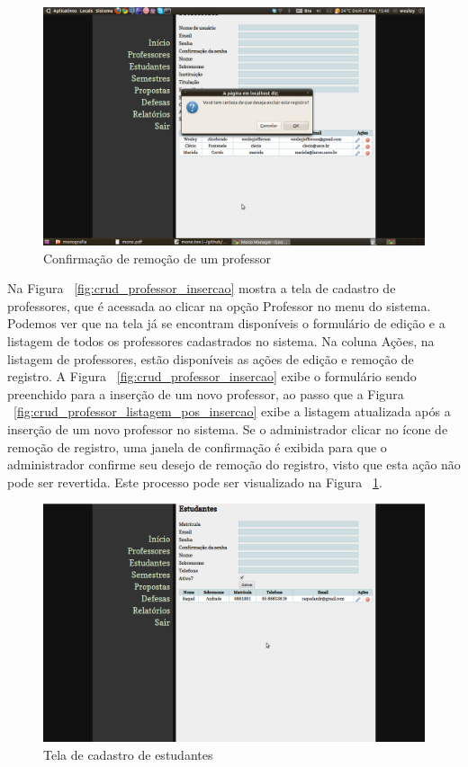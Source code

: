 \begin{figure}[htbp]
\centering
\includegraphics[width=1\textwidth]{fig/telas/administrador/crud_professor_remocao.png}
\caption{Confirmação de remoção de um professor}
\label{fig:crud_professor_remocao}
\end{figure}

Na Figura ~\ref{fig:crud_professor_insercao} mostra a tela de cadastro de professores, que
é acessada ao clicar na opção Professor no menu do sistema. Podemos ver que na tela
já se encontram disponíveis o formulário de edição e a listagem de todos os professores cadastrados 
no sistema. Na coluna Ações, na listagem de professores, estão disponíveis as ações de edição
e remoção de registro. A Figura ~\ref{fig:crud_professor_insercao} exibe o formulário sendo preenchido
para a inserção de um novo professor, ao passo que a Figura ~\ref{fig:crud_professor_listagem_pos_insercao}
exibe a listagem atualizada após a inserção de um novo professor no sistema. Se o administrador 
clicar no ícone de remoção de registro, uma janela de confirmação é exibida para que
o administrador confirme seu desejo de remoção do registro, visto que esta ação não pode
ser revertida. Este processo pode ser visualizado na Figura ~\ref{fig:crud_professor_remocao}.

\begin{figure}[htbp]
\centering
\includegraphics[width=1\textwidth]{fig/telas/administrador/crud_estudante.png}
\caption{Tela de cadastro de estudantes}
\label{fig:crud_estudante}
\end{figure}

